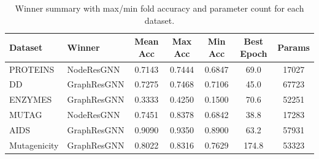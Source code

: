 \begin{table}[t]
\centering
\small
\caption{Winner summary with max/min fold accuracy and parameter count for each dataset.}
\label{tab:all_winners}
\begin{tabular}{l l c c c c c}
\toprule
Dataset & Winner & Mean Acc & Max Acc & Min Acc & Best Epoch & Params \\
\midrule
PROTEINS & NodeResGNN & 0.7143 & 0.7444 & 0.6847 & 69.0 & 17027 \\
DD & GraphResGNN & 0.7275 & 0.7468 & 0.7106 & 45.0 & 67723 \\
ENZYMES & GraphResGNN & 0.3333 & 0.4250 & 0.1500 & 70.6 & 52251 \\
MUTAG & NodeResGNN & 0.7451 & 0.8378 & 0.6842 & 38.8 & 17283 \\
AIDS & GraphResGNN & 0.9090 & 0.9350 & 0.8900 & 63.2 & 57931 \\
Mutagenicity & GraphResGNN & 0.8022 & 0.8316 & 0.7629 & 174.8 & 53323 \\
\bottomrule
\end{tabular}
\end{table}
